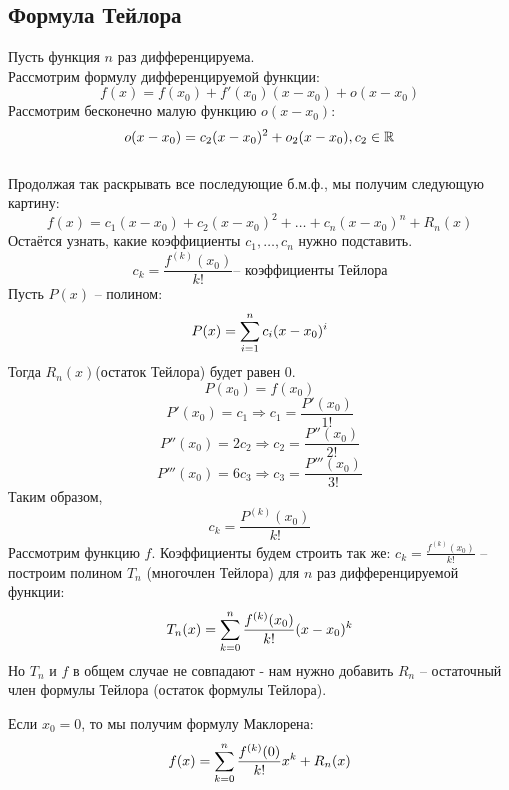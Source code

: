 \subsection{Формула Тейлора}
Пусть функция \( n \) раз дифференцируема. \\
Рассмотрим формулу дифференцируемой функции:
\[ f(x) = f(x_0) + f'(x_0)(x-x_0) + o(x-x_0) \]
Рассмотрим бесконечно малую функцию \( o(x-x_0) \):
\[ o(x-x_0) = c_2(x-x_0)^2 + o_2(x-x_0), c_2 \in \mathbb{R} \]
 \\ 
Продолжая так раскрывать все последующие б.м.ф., мы получим следующую картину:
\[ f(x) = c_1(x-x_0)+c_2(x-x_0)^2+\dots+c_n(x-x_0)^n+R_n(x) \]
Остаётся узнать, какие коэффициенты \( c_{1}, \dots, c_{n} \) нужно подставить. \\ 
\[ c_k = \frac{f^{(k)}(x_0)}{k!} \text{-- коэффициенты Тейлора} \]
Пусть \( P(x) \) -- полином: 
\[ P(x) = \sum \limits_{i=1}^{n} {c_i(x-x_0)^i} \]
Тогда \( R_n(x) \)(остаток Тейлора) будет равен \( 0 \).
\[ P(x_0) = f(x_0) \]
\[ P'(x_0) = c_1 \Longrightarrow c_1 = \frac{P'(x_0)}{1!} \]
\[ P''(x_0) = 2c_2 \Longrightarrow c_2 = \frac{P''(x_0)}{2!} \]
\[ P'''(x_0) = 6c_3 \Longrightarrow c_3 = \frac{P'''(x_0)}{3!} \]
Таким образом, \[ c_k = \frac{P^{(k)}(x_0)}{k!} \]
Рассмотрим функцию \( f \). Коэффициенты будем строить так же: \( c_k  = \frac{f^{(k)}(x_0)}{k!}\) -- построим полином \( T_n \) (многочлен Тейлора) для \( n \) раз дифференцируемой функции:
\[ T_n(x) = \sum \limits_{k=0}^{n} {\frac{f^{(k)}(x_0)}{k!}(x-x_0)^k} \]
Но \( T_n \) и \( f \) в общем случае не совпадают - нам нужно добавить \( R_n \) -- остаточный член формулы Тейлора (остаток формулы Тейлора).
\begin{note} 
    Если \( x_0 = 0 \), то мы получим формулу Маклорена: %
    \[ f(x) = \sum \limits_{k=0}^{n} {\frac{f^{(k)}(0)}{k!}x^k} + R_n(x) \]
\end{note}